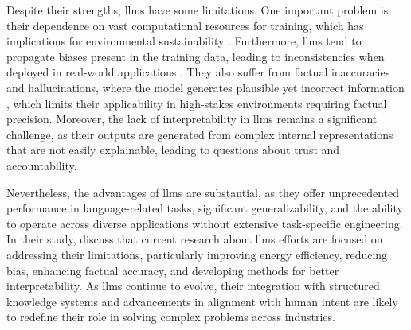 Despite their strengths, \glspl{llm} have some limitations.
One important problem is their dependence on vast computational resources for training, which has implications for environmental sustainability \cite{Strubell2019EnergyAP}.
Furthermore, \glspl{llm} tend to propagate biases present in the training data, leading to inconsistencies when deployed in real-world applications \cite{Naveed2023}.
They also suffer from factual inaccuracies and hallucinations, where the model generates plausible yet incorrect information \cite{Chang2024}, which limits their applicability in high-stakes environments requiring factual precision.
Moreover, the lack of interpretability in \glspl{llm} remains a significant challenge, as their outputs are generated from complex internal representations that are not easily explainable, leading to questions about trust and accountability.

Nevertheless, the advantages of \glspl{llm} are substantial, as they offer unprecedented performance in language-related tasks, significant generalizability, and the ability to operate across diverse applications without extensive task-specific engineering.
In their study, \textcite{Naveed2023} discuss that current research about \glspl{llm} efforts are focused on addressing their limitations, particularly improving energy efficiency, reducing bias, enhancing factual accuracy, and developing methods for better interpretability.
As \glspl{llm} continue to evolve, their integration with structured knowledge systems and advancements in alignment with human intent are likely to redefine their role in solving complex problems across industries.